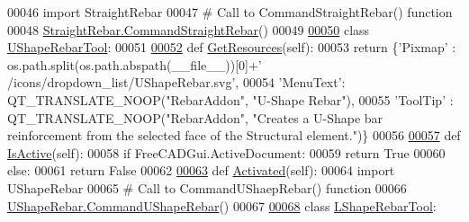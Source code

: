 \begin{DoxyCode}
00046         \textcolor{keyword}{import} StraightRebar
00047         \textcolor{comment}{# Call to CommandStraightRebar() function}
00048         \hyperlink{namespaceStraightRebar_a30f7aada2e2f91cdfae8267da36fe277}{StraightRebar.CommandStraightRebar}()
00049 
\hypertarget{RebarTools_8py_source.tex_l00050}{}\hyperlink{classRebarTools_1_1UShapeRebarTool}{00050} \textcolor{keyword}{class }\hyperlink{classRebarTools_1_1UShapeRebarTool}{UShapeRebarTool}:
00051 
\hypertarget{RebarTools_8py_source.tex_l00052}{}\hyperlink{classRebarTools_1_1UShapeRebarTool_a34496e5ce63e79b7e48a54153a22eb82}{00052}     \textcolor{keyword}{def }\hyperlink{classRebarTools_1_1UShapeRebarTool_a34496e5ce63e79b7e48a54153a22eb82}{GetResources}(self):
00053         \textcolor{keywordflow}{return} \{\textcolor{stringliteral}{'Pixmap'}  : os.path.split(os.path.abspath(\_\_file\_\_))[0]+\textcolor{stringliteral}{'
      /icons/dropdown\_list/UShapeRebar.svg'},
00054                 \textcolor{stringliteral}{'MenuText'}: QT\_TRANSLATE\_NOOP(\textcolor{stringliteral}{"RebarAddon"}, \textcolor{stringliteral}{"U-Shape Rebar"}),
00055                 \textcolor{stringliteral}{'ToolTip'} : QT\_TRANSLATE\_NOOP(\textcolor{stringliteral}{"RebarAddon"}, \textcolor{stringliteral}{"Creates a U-Shape bar reinforcement from the
       selected face of the Structural element."})\}
00056 
\hypertarget{RebarTools_8py_source.tex_l00057}{}\hyperlink{classRebarTools_1_1UShapeRebarTool_a880597c71ba40531b73e460b4517727c}{00057}     \textcolor{keyword}{def }\hyperlink{classRebarTools_1_1UShapeRebarTool_a880597c71ba40531b73e460b4517727c}{IsActive}(self):
00058         \textcolor{keywordflow}{if} FreeCADGui.ActiveDocument:
00059             \textcolor{keywordflow}{return} \textcolor{keyword}{True}
00060         \textcolor{keywordflow}{else}:
00061             \textcolor{keywordflow}{return} \textcolor{keyword}{False}
00062 
\hypertarget{RebarTools_8py_source.tex_l00063}{}\hyperlink{classRebarTools_1_1UShapeRebarTool_ab20a3f2af1de6e1af899caa94643e01e}{00063}     \textcolor{keyword}{def }\hyperlink{classRebarTools_1_1UShapeRebarTool_ab20a3f2af1de6e1af899caa94643e01e}{Activated}(self):
00064         \textcolor{keyword}{import} UShapeRebar
00065         \textcolor{comment}{# Call to CommandUShaepRebar() function}
00066         \hyperlink{namespaceUShapeRebar_abd24828525ea7ad774fdff3df325a173}{UShapeRebar.CommandUShapeRebar}()
00067 
\hypertarget{RebarTools_8py_source.tex_l00068}{}\hyperlink{classRebarTools_1_1LShapeRebarTool}{00068} \textcolor{keyword}{class }\hyperlink{classRebarTools_1_1LShapeRebarTool}{LShapeRebarTool}:

\end{DoxyCode}
